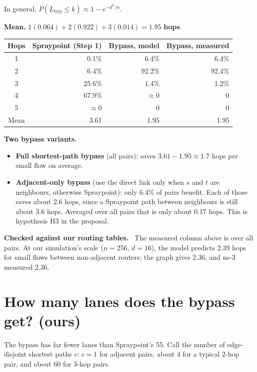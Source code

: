 \documentclass[11pt]{article}
\newenvironment{checked}
  {\par\smallskip\noindent\begin{lrbox}{\checkedbox}%
   \begin{minipage}{\dimexpr\linewidth-2\fboxsep\relax}%
   \textbf{Checked against our routing tables.}\ }
  {\end{minipage}\end{lrbox}\colorbox{black!5}{\usebox{\checkedbox}}\par\smallskip}
\begin{document}
In general, $P(L_{\text{byp}} \le k) \approx 1 - e^{-d^k / n}$.

\textbf{Mean.} $1(0.064) + 2(0.922) + 3(0.014) = \mathbf{1.95}$ \textbf{hops}.

\begin{center}
\begin{tabular}{@{}crrr@{}}
\toprule
Hops & Spraypoint (Step 1) & Bypass, model & Bypass, measured \\
\midrule
1 & 0.1\% & 6.4\% & 6.4\% \\
2 & 6.4\% & 92.2\% & 92.4\% \\
3 & 25.6\% & 1.4\% & 1.2\% \\
4 & 67.9\% & $\approx 0$ & 0 \\
5 & $\approx 0$ & 0 & 0 \\
\midrule
Mean & 3.61 & 1.95 & 1.95 \\
\bottomrule
\end{tabular}
\end{center}

\textbf{Two bypass variants.}
\begin{itemize}
  \item \textbf{Full shortest-path bypass} (all pairs): saves $3.61 - 1.95 \approx 1.7$ hops per small flow on average.
  \item \textbf{Adjacent-only bypass} (use the direct link only when $s$ and $t$ are neighbours, otherwise Spraypoint): only 6.4\% of pairs benefit. Each of those saves about 2.6 hops, since a Spraypoint path between neighbours is still about 3.6 hops. Averaged over all pairs that is only about 0.17 hops. This is hypothesis H3 in the proposal.
\end{itemize}

\begin{checked}
The measured column above is over all pairs. At our simulation's scale ($n = 256$, $d = 16$), the model predicts 2.39 hops for small flows between non-adjacent routers; the graph gives 2.36, and ns-3 measured 2.36.
\end{checked}

\section{How many lanes does the bypass get? (ours)}

The bypass has far fewer lanes than Spraypoint's 55. Call the number of edge-disjoint shortest paths $c$: $c = 1$ for adjacent pairs, about 4 for a typical 2-hop pair, and about 60 for 3-hop pairs.
\end{document}
